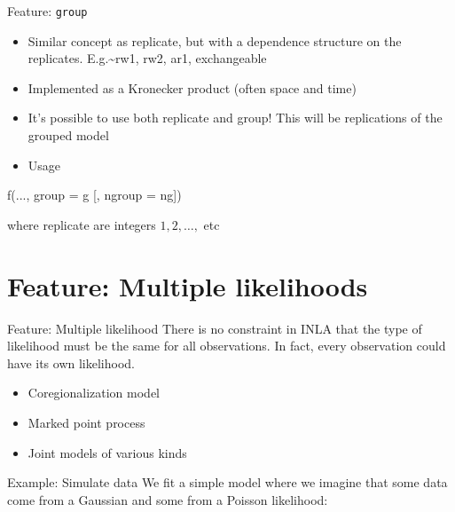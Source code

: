 \documentclass[
  ignorenonframetext,
  handout]{beamer}
\newenvironment{Shaded}{\begin{snugshade}}{\end{snugshade}}
\newcommand{\AttributeTok}[1]{\textcolor[rgb]{0.77,0.63,0.00}{#1}}
\newcommand{\FunctionTok}[1]{\textcolor[rgb]{0.00,0.00,0.00}{#1}}
\newcommand{\NormalTok}[1]{#1}
\begin{document}
\begin{frame}[fragile]{Feature: \texttt{group}}
\protect\hypertarget{feature-group-1}{}
\begin{itemize}
\item
  Similar concept as replicate, but with a dependence structure on the
  replicates. E.g.\textasciitilde rw1, rw2, ar1, exchangeable
\item
  Implemented as a Kronecker product (often space and time)
\item
  It's possible to use both replicate and group! This will be
  replications of the grouped model
\item
  Usage
\end{itemize}

\begin{Shaded}
\begin{Highlighting}[]
    \FunctionTok{f}\NormalTok{(..., }\AttributeTok{group =}\NormalTok{ g [, }\AttributeTok{ngroup =}\NormalTok{ ng])}
\end{Highlighting}
\end{Shaded}

where replicate are integers \(1, 2, \ldots,\) etc
\end{frame}

\hypertarget{feature-multiple-likelihoods}{%
\section{Feature: Multiple
likelihoods}\label{feature-multiple-likelihoods}}

\begin{frame}{Feature: Multiple likelihood}
\protect\hypertarget{feature-multiple-likelihood}{}
There is no constraint in INLA that the type of likelihood must be the
same for all observations. In fact, every observation could have its own
likelihood.

\begin{itemize}
\item
  Coregionalization model
\item
  Marked point process
\item
  Joint models of various kinds
\end{itemize}
\end{frame}

\begin{frame}{Example: Simulate data}
\protect\hypertarget{example-simulate-data-2}{}
We fit a simple model where we imagine that some data come from a
Gaussian and some from a Poisson likelihood: \tiny

\normalsize
\end{frame}
\end{document}
